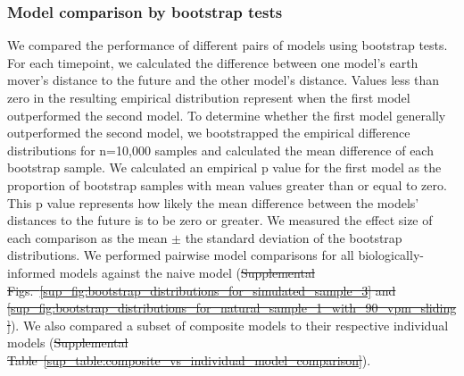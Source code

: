 \documentclass[9pt,lineno]{elife} %
\providecommand{\DIFadd}[1]{{\protect\color{blue}\uwave{#1}}} %
\providecommand{\DIFdel}[1]{{\protect\color{red}\sout{#1}}}                      %
\providecommand{\DIFaddbegin}{} %
\providecommand{\DIFaddend}{} %
\providecommand{\DIFdelbegin}{} %
\providecommand{\DIFdelend}{} %
\providecommand{\DIFaddtex}[1]{{\protect\color{blue}\uwave{#1}}} %
\providecommand{\DIFdeltex}[1]{{\protect\color{red}\sout{#1}}}                      %
\providecommand{\DIFaddbegin}{} %
\providecommand{\DIFaddend}{} %
\providecommand{\DIFdelbegin}{} %
\providecommand{\DIFdelend}{} %
\providecommand{\DIFadd}[1]{\texorpdfstring{\DIFaddtex{#1}}{#1}} %
\providecommand{\DIFdel}[1]{\texorpdfstring{\DIFdeltex{#1}}{}} %
\newcommand{\DIFscaledelfig}{0.5}
\newlength{\DIFdelgraphicswidth} %
\newlength{\DIFdelgraphicsheight} %
\newcommand{\DIFaddincludegraphics}[2][]{{\color{blue}\fbox{\DIFOincludegraphics[#1]{#2}}}} %
\newcommand{\DIFdelincludegraphics}[2][]{%
\sbox{\DIFdelgraphicsbox}{\DIFOincludegraphics[#1]{#2}}%
\settoboxwidth{\DIFdelgraphicswidth}{\DIFdelgraphicsbox} %
\settoboxtotalheight{\DIFdelgraphicsheight}{\DIFdelgraphicsbox} %
\scalebox{\DIFscaledelfig}{%
\parbox[b]{\DIFdelgraphicswidth}{\usebox{\DIFdelgraphicsbox}\\[-\baselineskip] \rule{\DIFdelgraphicswidth}{0em}}\llap{\resizebox{\DIFdelgraphicswidth}{\DIFdelgraphicsheight}{%
\setlength{\unitlength}{\DIFdelgraphicswidth}%
\begin{picture}(1,1)%
\thicklines\linethickness{2pt} %
{\color[rgb]{1,0,0}\put(0,0){\framebox(1,1){}}}%
{\color[rgb]{1,0,0}\put(0,0){\line( 1,1){1}}}%
{\color[rgb]{1,0,0}\put(0,1){\line(1,-1){1}}}%
\end{picture}%
}\hspace*{3pt}}} %
} %
\DeclareRobustCommand{\DIFaddbegin}{\DIFOaddbegin \let\includegraphics\DIFaddincludegraphics} %
\DeclareRobustCommand{\DIFaddend}{\DIFOaddend \let\includegraphics\DIFOincludegraphics} %
\DeclareRobustCommand{\DIFdelbegin}{\DIFOdelbegin \let\includegraphics\DIFdelincludegraphics} %
\DeclareRobustCommand{\DIFdelend}{\DIFOaddend \let\includegraphics\DIFOincludegraphics} %
\begin{document}
\DIFaddend \subsubsection*{Model comparison by bootstrap tests}

We compared the performance of different pairs of models using bootstrap tests.
For each timepoint, we calculated the difference between one model's earth mover's distance to the future and the other model's distance.
Values less than zero in the resulting empirical distribution represent when the first model outperformed the second model.
To determine whether the first model generally outperformed the second model, we bootstrapped the empirical difference distributions for n=10,000 samples and calculated the mean difference of each bootstrap sample.
We calculated an empirical p value for the first model as the proportion of bootstrap samples with mean values greater than or equal to zero.
This p value represents how likely the mean difference between the models' distances to the future is to be zero or greater.
We measured the effect size of each comparison as the mean $\pm$ the standard deviation of the bootstrap distributions.
We performed pairwise model comparisons for all biologically-informed models against the naive model (\DIFdelbegin \DIFdel{Supplemental Figs.~\ref{sup_fig:bootstrap_distributions_for_simulated_sample_3} and \ref{sup_fig:bootstrap_distributions_for_natural_sample_1_with_90_vpm_sliding}}\DIFdelend \DIFaddbegin \DIFadd{Figures~\ref{fig:bootstrap_distributions_for_simulated_sample_3} and \ref{fig:bootstrap_distributions_for_natural_sample_1_with_90_vpm_sliding}}\DIFaddend ).
We also compared a subset of composite models to their respective individual models (\DIFdelbegin \DIFdel{Supplemental Table~\ref{sup_table:composite_vs_individual_model_comparison}}\DIFdelend \DIFaddbegin \DIFadd{Table~\ref{table:composite_vs_individual_model_comparison}}\DIFaddend ).
\end{document}
